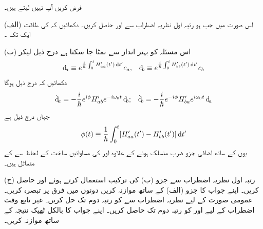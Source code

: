 فرض کریں آپ  نہیں لیتے ہیں۔

(الف) اس صورت میں جب  ہو رتبہ اول نظریہ اضطراب سے  اور  حاصل کریں۔ دکھائیں کہ  کی طاقت ایک تک ۔

(ب) اس مسئلہ کو بہتر انداز سے نمٹا  جا سکتا ہے درج ذیل لیکر
\begin{align}
	\dif_a\equiv e^{\frac{i}{\hslash}\int_{0}^{t}H'_{aa}(t')\dif t'}c_a,&&\dif_b\equiv e^{\frac{i}{\hslash}\int_{0}^{t}H'_{bb}(t')\dif t'}c_b
\end{align}
دکھائیں کہ درج ذیل ہوگا 
\begin{align}
	\dot{\dif}_a=-\frac{i}{\hslash}e^{i\phi}H'_{ab}e^{-i\omega_0t}\dif_b;&&\dot{\dif}_b=-\frac{i}{\hslash}e^{-i\phi}H'_{ba}e^{i\omega_0t}\dif_a
\end{align}
جہاں درج ذیل ہے
\begin{align}
	\phi(t)\equiv\frac{1}{\hslash}\int_{0}^{t}[H'_{aa}(t')-H'_{bb}(t')]\dif t'
\end{align}
یوں  کے ساتھ اضافی جزو ضرب  منسلک ہونے کے علاوہ  اور  کی مساواتیں ساخت کے لحاظ سے  کے متماثل ہیں۔

(ج) رتبہ اول نظریہ اضطراب سے جزو (ب) کی ترکیب استعمال کرتے ہوئے  اور  حاصل کریں۔ اپنے جواب کا جزو (الف) کے ساتھ موازنہ کریں دونوں میں فرق پر تبصرہ کریں۔
عمومی صورت  کے لیے نظریہ اضطراب سے  کو رتبہ دوم تک حل کریں۔
غیر تابع وقت اضطراب  کے لیے  اور  کو رتبہ دوم تک حاصل کریں۔ اپنے جواب کا بالکل ٹھیک نتیجہ کے ساتھ موازنہ کریں۔


